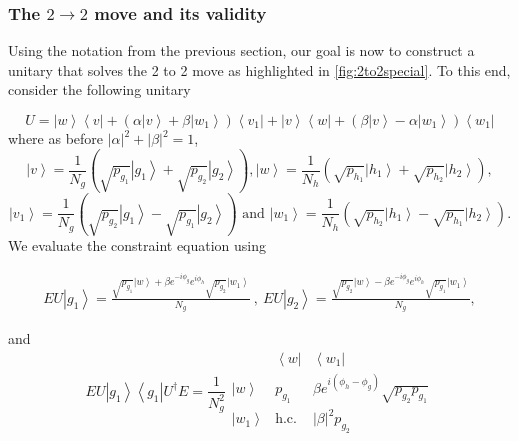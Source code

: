 \documentclass{theoretics}
\newcommand{\atul}[1]{#1} %
\begin{document}
\subsubsection{The \texorpdfstring{$2\to2$}{2 -> 2} move and its validity}\label{subsubsec:2to2}
\atul{Using the notation from the previous section, our goal is now to construct a unitary that solves the 2 to 2 move as highlighted in  \cref{fig:2to2special}. To this end, consider the following unitary} %

%
\begin{displaymath}
  U=\left|w\right\rangle \left\langle v\right|+\left(\alpha\left|v\right\rangle +\beta\left|w_{1}\right\rangle \right)\left\langle v_{1}\right|+\left|v\right\rangle \left\langle w\right|+\left(\beta\left|v\right\rangle -\alpha\left|w_{1}\right\rangle \right)\left\langle w_{1}\right|
\end{displaymath}
where as before $\left|\alpha\right|^{2}+\left|\beta\right|^{2}=1$,
\begin{displaymath}
  \left|v\right\rangle =\frac{1}{N_{g}}\left(\sqrt{p_{g_{1}}}\left|g_{1}\right\rangle +\sqrt{p_{g_{2}}}\left|g_{2}\right\rangle \right),
  \left|w\right\rangle =\frac{1}{N_{h}}\left(\sqrt{p_{h_{1}}}\left|h_{1}\right\rangle +\sqrt{p_{h_{2}}}\left|h_{2}\right\rangle \right),
\end{displaymath}
\begin{displaymath}
  \left|v_{1}\right\rangle =\frac{1}{N_{g}}\left(\sqrt{p_{g_{2}}}\left|g_{1}\right\rangle -\sqrt{p_{g_{1}}}\left|g_{2}\right\rangle \right) \text{ and }
  \left|w_{1}\right\rangle =\frac{1}{N_{h}}\left(\sqrt{p_{h_{2}}}\left|h_{1}\right\rangle -\sqrt{p_{h_{1}}}\left|h_{2}\right\rangle \right).
\end{displaymath}
We evaluate the constraint equation using
\begin{footnotesize}
  \begin{align*}
    EU\left|g_{1}\right\rangle   =\frac{\sqrt{p_{g_{1}}}\left|w\right\rangle +\beta e^{-i\phi_{g}}e^{i\phi_{h}}\sqrt{p_{g_{2}}}\left|w_{1}\right\rangle }{N_{g}}\ , \
    EU\left|g_{2}\right\rangle   =\frac{\sqrt{p_{g_{2}}}\left|w\right\rangle -\beta e^{-i\phi_{g}}e^{i\phi_{h}}\sqrt{p_{g_{1}}}\left|w_{1}\right\rangle }{N_{g}},
  \end{align*}
\end{footnotesize}
and
\begin{displaymath}
  EU\left|g_{1}\right\rangle \left\langle g_{1}\right|U^{\dagger}E=\frac{1}{N_{g}^{2}}\begin{array}{c|cc}
                                & \left\langle w\right| & \left\langle w_{1}\right|                               \\
    \hline \left|w\right\rangle & p_{g_{1}}             & \beta e^{i(\phi_{h}-\phi_{g})}\sqrt{p_{g_{2}}p_{g_{1}}} \\
    \left|w_{1}\right\rangle    & \text{h.c.}           & \left|\beta\right|^{2}p_{g_{2}}
  \end{array}
\end{displaymath}
\end{document}
